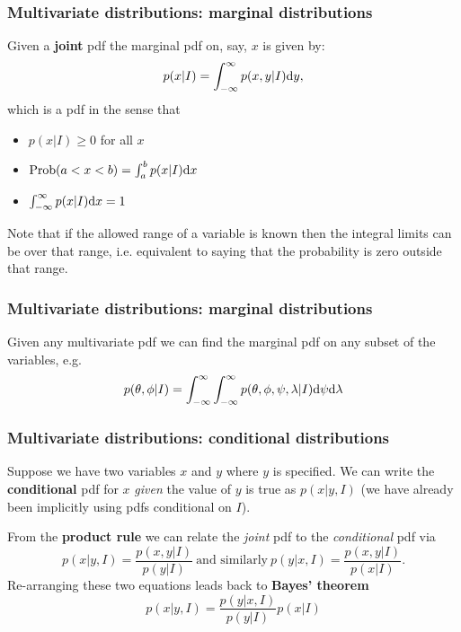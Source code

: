 \begin{frame}

\frametitle{Multivariate distributions: marginal distributions}
\label{multivariatedistributions:marginaldistributions}

Given a \textbf{joint} pdf the marginal pdf on, say, $x$ is given by:
\[
p(x|I) = \int_{-\infty}^{\infty} p(x,y|I) {\rm d}y,
\]
which is a pdf in the sense that

\begin{itemize}
\item $p(x|I) \ge 0$ for all $x$

\item $\text{Prob}(a < x < b) = \int_a^b p(x|I) {\rm d}x$

\item $\int_{-\infty}^{\infty} p(x|I) {\rm d}x = 1$

\end{itemize}

Note that if the allowed range of a variable is known then the integral limits can be over that
range, i.e. equivalent to saying that the probability is zero outside that range.

\end{frame}

\begin{frame}

\frametitle{Multivariate distributions: marginal distributions}
\label{multivariatedistributions:marginaldistributions}

Given any multivariate pdf we can find the marginal pdf on any subset of the variables, e.g.
\[
p(\theta, \phi|I) = \int_{-\infty}^{\infty}\int_{-\infty}^{\infty} p(\theta, \phi, \psi, \lambda|I) {\rm d}\psi {\rm d}\lambda
\]

\end{frame}

\begin{frame}

\frametitle{Multivariate distributions: conditional distributions}
\label{multivariatedistributions:conditionaldistributions}

Suppose we have two variables $x$ and $y$ where $y$ is specified. We can write the \textbf{conditional} pdf
for $x$ \emph{given} the value of $y$ is true as $p(x|y,I)$ (we have already been implicitly using pdfs conditional
on $I$).

From the \textbf{product rule} we can relate the \emph{joint} pdf to the \emph{conditional} pdf via
\[
p(x|y,I) = \frac{p(x,y|I)}{p(y|I)}~\text{and similarly}~p(y|x,I) = \frac{p(x,y|I)}{p(x|I)}.
\]
Re-arranging these two equations leads back to \textbf{Bayes' theorem}
\[
p(x|y,I) = \frac{p(y|x,I)}{p(y|I)}p(x|I)
\]

\end{frame}

